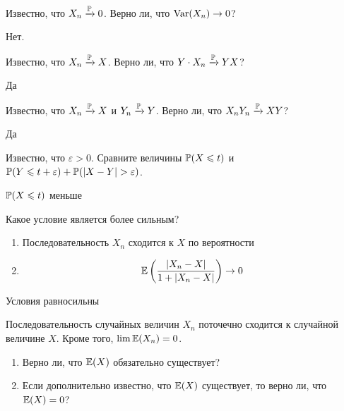\begin{problem}
Известно, что $X_n \xrightarrow{\P} 0$. Верно ли, что $\Var(X_n)\to 0$? 
\end{problem} 
\begin{solution} 
Нет.
\end{solution}

\begin{problem}
Известно, что $X_n \xrightarrow{\P} X$. Верно ли, что $Y\cdot X_n \xrightarrow{\P} YX$? 
\end{problem} 
\begin{solution} 
Да
\end{solution}

\begin{problem}
Известно, что $X_n \xrightarrow{\P} X$ и $Y_n \xrightarrow{\P} Y$. Верно ли, что $X_nY_n \xrightarrow{\P} XY$? 
\end{problem} 
\begin{solution} 
Да
\end{solution}

\begin{problem}
Известно, что $\varepsilon>0$. Сравните величины $\P(X\leq t)$ и $\P(Y\leq t+\varepsilon)+\P(|X-Y|>\varepsilon)$.
\end{problem} 
\begin{solution} 
$\P(X\leq t)$ меньше
\end{solution}

\begin{problem}
Какое условие является более сильным?
\begin{enumerate}
\item Последовательность $X_n$ сходится к $X$ по вероятности
\item \[ 
\E\left(\frac{|X_n-X|}{1+|X_n-X|}\right)\to 0
\]
\end{enumerate}
\end{problem} 
\begin{solution} 
Условия равносильны
\end{solution}

\begin{problem}
Последовательность случайных величин $X_n$ поточечно сходится к случайной величине $X$. Кроме того, $\lim \E(X_n)=0$. 
\begin{enumerate}
\item Верно ли, что $\E(X)$ обязательно существует? 
\item Если дополнительно известно, что $\E(X)$ существует, то верно ли, что $\E(X)=0$?
\end{enumerate}
\end{problem} 
\begin{solution} 

\end{solution}

